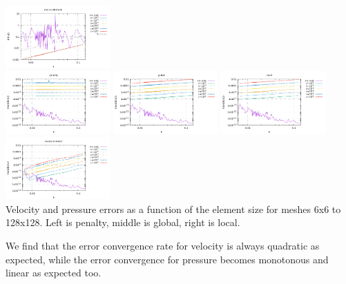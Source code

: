\begin{center}
\includegraphics[width=4cm]{python_codes/fieldstone_115/results/dh/errorsP_macro.pdf}\\
\includegraphics[width=4cm]{python_codes/fieldstone_115/results/dh/divv_penalty.pdf}
\includegraphics[width=4cm]{python_codes/fieldstone_115/results/dh/divv_global.pdf}
\includegraphics[width=4cm]{python_codes/fieldstone_115/results/dh/divv_local.pdf}
\includegraphics[width=4cm]{python_codes/fieldstone_115/results/dh/divv_macro.pdf}\\
{\captionfont Velocity and pressure errors as a function of the element size for meshes 6x6 to 128x128.
Left is penalty, middle is global, right is local.}
\end{center}
We find that the error convergence rate for velocity is always quadratic as expected, 
while the error convergence for pressure becomes monotonous and linear as expected too.

